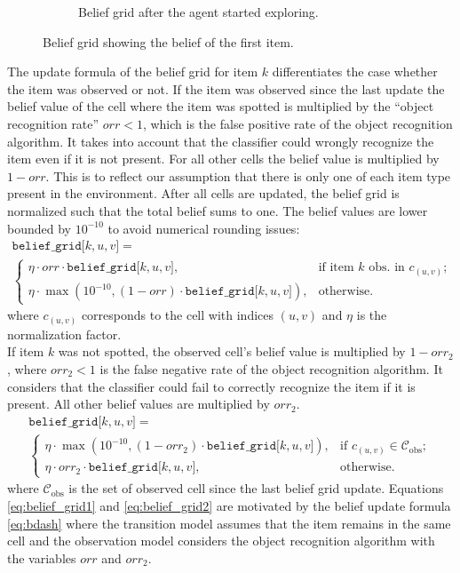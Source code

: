 \begin{figure}[h]
\begin{subfigure}[t]{0.48\textwidth}
        \caption{Belief grid after the agent started exploring.}
        \label{subfig:b_sc03_observed}
    \end{subfigure}
    \caption{Belief grid showing the belief of the first item.}
    \label{fig:belief_grid}
\end{figure}
%

The update formula of the belief grid for item $k$ differentiates the case whether the item was observed or not. If the item was observed since the last update the belief value of the cell where the item was spotted is multiplied by the “object recognition rate” $orr<1$, which is the false positive rate of the object recognition algorithm. It takes into account that the classifier could wrongly recognize the item even if it is not present. For all other cells the belief value is multiplied by $1 - orr$. This is to reflect our assumption that there is only one of each item type present in the environment. After all cells are updated, the belief grid is normalized such that the total belief sums to one. The belief values are lower bounded by $10^{-10}$ to avoid numerical rounding issues: 
%
\begin{multline}\label{eq:belief_grid1}
    \texttt{belief\_grid[$k, u, v$]} =\\ 
    \begin{cases} 
        \eta \cdot orr \cdot \texttt{belief\_grid[$k, u, v$]}, &\text{if item $k$ obs. in }c_{(u,v)}; \\
        \eta \cdot \max\left(10^{-10}, (1 - orr) \cdot \texttt{belief\_grid[$k, u, v$]}\right), &\text{otherwise}.
    \end{cases}
\end{multline}
% 
where $c_{(u,v)}$ corresponds to the cell with indices $(u,v)$ and $\eta$ is the normalization factor.\\

If item $k$ was not spotted, the observed cell's belief value is multiplied by $1 - orr_2$, where $orr_2 < 1$ is the false negative rate of the object recognition algorithm. It considers that the classifier could fail to correctly recognize the item if it is present. All other belief values are multiplied by $orr_2$. 
%
\begin{multline}\label{eq:belief_grid2}
    \texttt{belief\_grid[$k, u, v$]} =\\ 
    \begin{cases} 
        \eta \cdot\max\left(10^{-10}, (1 -  orr_2) \cdot \texttt{belief\_grid[$k, u, v$]}\right), &\text{if }c_{(u,v)} \in \mathcal{C}_\text{obs};\\
        \eta \cdot orr_2 \cdot \texttt{belief\_grid[$k, u, v$]}, &\text{otherwise.}
    \end{cases}
\end{multline}
%
where $\mathcal{C}_\text{obs}$ is the set of observed cell since the last belief grid update. Equations \ref{eq:belief_grid1} and \ref{eq:belief_grid2} are motivated by the belief update formula \ref{eq:bdash} where the transition model assumes that the item remains in the same cell and the observation model considers the object recognition algorithm with the variables $orr$ and $orr_2$. 


